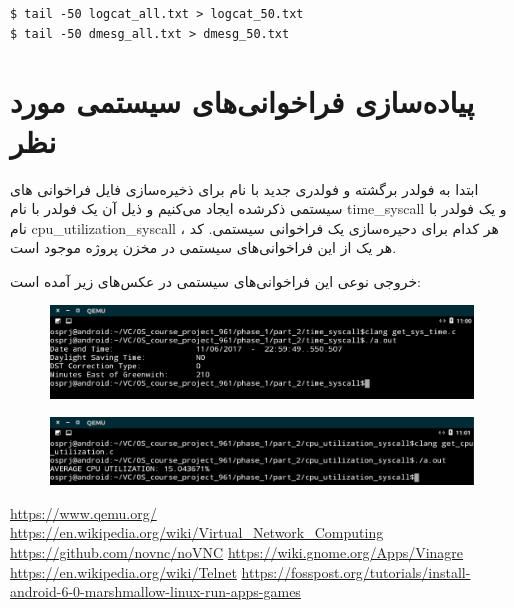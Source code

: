 \documentclass{article}
\begin{document}
\begin{latin}
\begin{verbatim}
$ tail -50 logcat_all.txt > logcat_50.txt
$ tail -50 dmesg_all.txt > dmesg_50.txt
\end{verbatim}
\end{latin}

\section*{پیاده‌سازی فراخوانی‌های سیستمی مورد نظر}

ابتدا به فولدر  برگشته و فولدری جدید با نام  برای ذخیره‌سازی فایل‌ فراخوانی‌ های سیستمی ذکر‌شده ایجاد می‌کنیم و ذیل آن یک فولدر با نام time\_syscall و یک فولدر با نام cpu\_utilization\_syscall ، هر کدام برای دحیره‌سازی یک فراخوانی سیستمی. کد هر یک از این فراخوانی‌های سیستمی در مخزن پروژه موجود است.

خروجی نوعی این فراخوانی‌‌های سیستمی در عکس‌های زیر آمده است:

\begin{figure}[h]
	\centering	
	\includegraphics[width = 1\textwidth]{images/syscall1.png}
\end{figure}

\begin{figure}[h]
	\centering	
	\includegraphics[width = 1\textwidth]{images/syscall2.png}
\end{figure}

\begin{thebibliography}{9}

\latin
{}
\url{https://www.qemu.org/}
\url{https://en.wikipedia.org/wiki/Virtual_Network_Computing}
\url{https://github.com/novnc/noVNC}
\url{https://wiki.gnome.org/Apps/Vinagre}
\url{https://en.wikipedia.org/wiki/Telnet}
\url{https://fosspost.org/tutorials/install-android-6-0-marshmallow-linux-run-apps-games}
\end{thebibliography}
\end{document}

